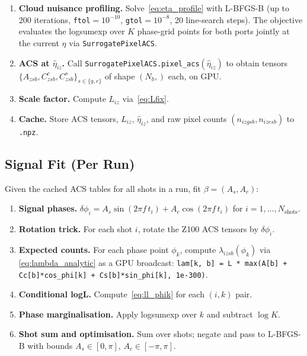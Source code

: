 \documentclass[11pt,a4paper]{article}
\begin{document}
\begin{enumerate}

  \item \textbf{Cloud nuisance profiling.}
        Solve~\eqref{eq:eta_profile} with L-BFGS-B (up to 200 iterations,
        \texttt{ftol}$=10^{-10}$, \texttt{gtol}$=10^{-8}$, 20 line-search steps).
        The objective evaluates the logsumexp over $K$ phase-grid points for
        both ports jointly at the current $\eta$ via \texttt{SurrogatePixelACS}.

  \item \textbf{ACS at $\hat\eta_{iz}$.}
        Call \texttt{SurrogatePixelACS.pixel\_acs}$(\hat\eta_{iz})$ to obtain
        tensors $\{A_{zsb}, C^c_{zsb}, C^s_{zsb}\}_{s \in \{g,e\}}$ of shape
        $(N_b,)$ each, on GPU.

  \item \textbf{Scale factor.}
        Compute $L_{iz}$ via~\eqref{eq:Lfix}.

  \item \textbf{Cache.}
        Store ACS tensors, $L_{iz}$, $\hat\eta_{iz}$, and raw pixel counts
        $(n_{izgsb}, n_{izesb})$ to \texttt{.npz}.

\end{enumerate}

\subsection{Signal Fit (Per Run)}

Given the cached ACS tables for all shots in a run, fit $\beta = (A_s, A_c)$:

\begin{enumerate}

  \item \textbf{Signal phases.}
        $\delta\phi_i = A_s\sin(2\pi f\,t_i) + A_c\cos(2\pi f\,t_i)$
        for $i = 1,\ldots,N_\mathrm{shots}$.

  \item \textbf{Rotation trick.}
        For each shot $i$, rotate the Z100 ACS tensors by $\delta\phi_i$.

  \item \textbf{Expected counts.}
        For each phase point $\phi_k$, compute $\lambda_{izsb}(\phi_k)$ via
        \eqref{eq:lambda_analytic} as a GPU broadcast:
        \texttt{lam[k, b] = L * max(A[b] + Cc[b]*cos\_phi[k]
        + Cs[b]*sin\_phi[k], 1e-300)}.

  \item \textbf{Conditional logL.}
        Compute~\eqref{eq:ll_phik} for each $(i, k)$ pair.

  \item \textbf{Phase marginalisation.}
        Apply logsumexp over $k$ and subtract $\log K$.

  \item \textbf{Shot sum and optimisation.}
        Sum over shots; negate and pass to L-BFGS-B with bounds
        $A_s \in [0, \pi]$, $A_c \in [-\pi, \pi]$.

\end{enumerate}
\end{document}
